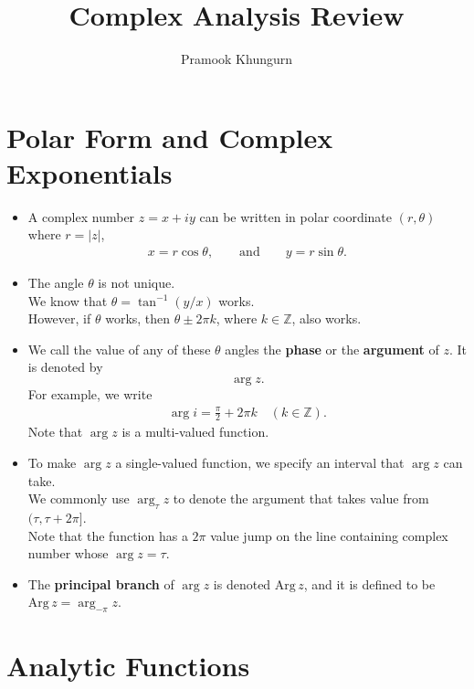 \documentclass[10pt]{article}
\title{Complex Analysis Review}
\author{Pramook Khungurn}
\newcommand{\Arg}{\mathrm{Arg\,}}
\begin{document}
	\maketitle
	
  \section{Polar Form and Complex Exponentials} %
  \label{sec:polar_form_and_complex_exponentials}

  \begin{itemize}
    \item A complex number $z = x + iy$ can be written in polar coordinate $(r, \theta)$ where $r = |z|$,
    \begin{align*}
      x = r \cos \theta,\qquad \mbox{and} \qquad y = r \sin\theta.
    \end{align*}

    \item The angle $\theta$ is not unique.\\
    We know that $\theta = \tan^{-1} (y/x)$ works.\\
    However, if $\theta$ works, then $\theta \pm 2\pi k$, where $k \in \mathbb{Z}$, also works.

    \item We call the value of any of these $\theta$ angles the {\bf phase} or the {\bf argument} of $z$. It is denoted by $$\arg z.$$
    For example, we write
    \begin{align*}
      \arg i = \frac{\pi}{2} + 2\pi k \quad (k \in \mathbb{Z}).
    \end{align*}
    Note that $\arg z$ is a multi-valued function.

    \item To make $\arg z$ a single-valued function, we specify an interval that $\arg z$ can take.\\
    We commonly use $\arg_\tau z$ to denote the argument that takes value from $(\tau, \tau + 2\pi]$.\\
    Note that the function has a $2\pi$ value jump on the line containing complex number whose $\arg z = \tau$.    

    \item The {\bf principal branch} of $\arg z$ is denoted $\Arg z$, and it is defined to be $\Arg z = \arg_{-\pi} z$.
  \end{itemize}  

  \section{Analytic Functions} %
  \label{sec:analytic_functions}
\end{document}
